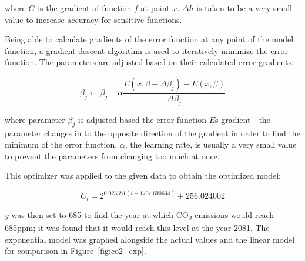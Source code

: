 \documentclass{mcmthesis}
\begin{document}
    \noindent where $G$ is the gradient of function $f$ at point $x$.
    $\Delta h$ is taken to be a very small value to increase accuracy for sensitive functions.

    Being able to calculate gradients of the error function at any point of the model function, a gradient descent algorithm is used to iteratively minimize the error function.
    The parameters are adjusted based on their calculated error gradients:

    \begin{equation}
        \beta_j \longleftarrow \beta_j - \alpha \frac{E(x, \beta + \Delta \beta_j) - E(x, \beta)}{\Delta \beta_j}
    \end{equation}

    \noindent where parameter $\beta_j$ is adjusted based the error function $E$\textquotesingle s gradient - the parameter changes in to the opposite direction of the gradient in order to find the minimum of the error function.
    $\alpha$, the learning rate, is usually a very small value to prevent the parameters from changing too much at once.

    This optimizer was applied to the given data to obtain the optimized model:

    \begin{equation}
        C_i = 2^{0.023381 (i - 1707.690634)} + 256.024002
    \end{equation}

    $y$ was then set to 685 to find the year at which CO\textsubscript{2} emissions would reach 685ppm; it was found that it would reach this level at the year 2081.
    The exponential model was graphed alongside the actual values and the linear model for comparison in Figure~\ref{fig:co2_exp}.
\end{document}
